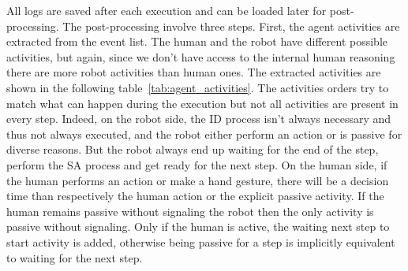All logs are saved after each execution and can be loaded later for post-processing. The post-processing involve three steps. First, the agent activities are extracted from the event list. The human and the robot have different possible activities, but again, since we don't have access to the internal human reasoning there are more robot activities than human ones. The extracted activities are shown in the following table~\ref{tab:agent_activities}. The activities orders try to match what can happen during the execution but not all activities are present in every step. Indeed, on the robot side, the ID process isn't always necessary and thus not always executed, and the robot either perform an action or is passive for diverse reasons. But the robot always end up waiting for the end of the step, perform the SA process and get ready for the next step. On the human side, if the human performs an action or make a hand gesture, there will be a decision time than respectively the human action or the explicit passive activity. If the human remains passive without signaling the robot then the only activity is passive without signaling. Only if the human is active, the waiting next step to start activity is added, otherwise being passive for a step is implicitly equivalent to waiting for the next step.  

